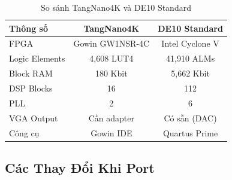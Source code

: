 \documentclass[12pt,a4paper]{article}
\begin{document}
\begin{table}[H]
\centering
\caption{So sánh TangNano4K và DE10 Standard}
\begin{tabular}{|l|c|c|}
\hline
\textbf{Thông số} & \textbf{TangNano4K} & \textbf{DE10 Standard} \\
\hline
FPGA & Gowin GW1NSR-4C & Intel Cyclone V \\
\hline
Logic Elements & 4,608 LUT4 & 41,910 ALMs \\
\hline
Block RAM & 180 Kbit & 5,662 Kbit \\
\hline
DSP Blocks & 16 & 112 \\
\hline
PLL & 2 & 6 \\
\hline
VGA Output & Cần adapter & Có sẵn (DAC) \\
\hline
Công cụ & Gowin IDE & Quartus Prime \\
\hline
\end{tabular}
\end{table}

\subsection{Các Thay Đổi Khi Port}
\end{document}
